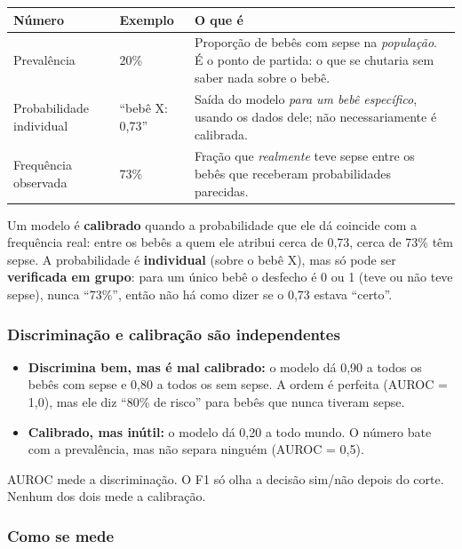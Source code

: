 \documentclass[11pt,a4paper]{article}
\begin{document}
\begin{center}
\small
\renewcommand{\arraystretch}{1.3}
\begin{tabular}{@{}lp{3.4cm}p{7.4cm}@{}}
\toprule
\textbf{Número} & \textbf{Exemplo} & \textbf{O que é} \\
\midrule
Prevalência & 20\% & Proporção de bebês com sepse na \emph{população}. É o ponto de partida: o que se chutaria sem saber nada sobre o bebê. \\
Probabilidade individual & ``bebê X: 0,73'' & Saída do modelo \emph{para um bebê específico}, usando os dados dele; não necessariamente é calibrada. \\
Frequência observada & 73\% & Fração que \emph{realmente} teve sepse entre os bebês que receberam probabilidades parecidas. \\
\bottomrule
\end{tabular}
\end{center}

\begin{conceito}[calibração]
Um modelo é \textbf{calibrado} quando a probabilidade que ele dá coincide com a frequência real: entre os bebês a quem ele atribui cerca de 0,73, cerca de 73\% têm sepse.
A probabilidade é \textbf{individual} (sobre o bebê X), mas só pode ser \textbf{verificada em grupo}: para um único bebê o desfecho é 0 ou 1 (teve ou não teve sepse), nunca ``73\%'', então não há como dizer se o 0,73 estava ``certo''.
\end{conceito}

\subsubsection*{Discriminação e calibração são independentes}

\begin{itemize}
  \item \textbf{Discrimina bem, mas é mal calibrado:} o modelo dá 0,90 a todos os bebês com sepse e 0,80 a todos os sem sepse. A ordem é perfeita (AUROC = 1,0), mas ele diz ``80\% de risco'' para bebês que nunca tiveram sepse.
  \item \textbf{Calibrado, mas inútil:} o modelo dá 0,20 a todo mundo. O número bate com a prevalência, mas não separa ninguém (AUROC = 0,5).
\end{itemize}

AUROC mede a discriminação. O F1 só olha a decisão sim/não depois do corte. Nenhum dos dois mede a calibração.

\subsubsection*{Como se mede}
\end{document}
